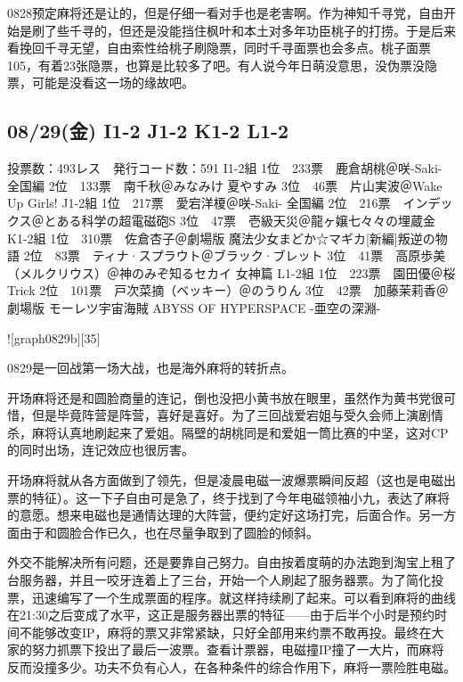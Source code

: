 0828预定麻将还是让的，但是仔细一看对手也是老害啊。作为神知千寻党，自由开始是刷了些千寻的，但还是没能挡住枫叶和本土对多年功臣桃子的打捞。于是后来看挽回千寻无望，自由索性给桃子刷隐票，同时千寻面票也会多点。桃子面票105，有着23张隐票，也算是比较多了吧。有人说今年日萌没意思，没伪票没隐票，可能是没看这一场的缘故吧。

\subsection{08/29(金) I1-2 J1-2 K1-2 L1-2}

    投票数：493レス　発行コード数：591
    I1-2組
    1位　233票　鹿倉胡桃＠咲-Saki- 全国編
    2位　133票　南千秋＠みなみけ 夏やすみ
    3位　46票　片山実波＠Wake Up Girls!
    J1-2組
    1位　217票　愛宕洋榎＠咲-Saki- 全国編
    2位　216票　インデックス＠とある科学の超電磁砲S
    3位　47票　壱級天災＠龍ヶ嬢七々々の埋蔵金
    K1-2組
    1位　310票　佐倉杏子＠劇場版 魔法少女まどか☆マギカ[新編]叛逆の物語
    2位　83票　ティナ·スプラウト＠ブラック·ブレット
    3位　41票　高原歩美（メルクリウス）＠神のみぞ知るセカイ 女神篇
    L1-2組
    1位　223票　園田優＠桜Trick
    2位　101票　戸次菜摘（ベッキー）＠のうりん
    3位　42票　加藤茉莉香＠劇場版 モーレツ宇宙海賊 ABYSS OF HYPERSPACE -亜空の深淵-

![graph0829b][35]

0829是一回战第一场大战，也是海外麻将的转折点。

开场麻将还是和圆脸商量的连记，倒也没把小黄书放在眼里，虽然作为黄书党很可惜，但是毕竟阵营是阵营，喜好是喜好。为了三回战爱宕姐与受久会师上演剧情杀，麻将认真地刷起来了爱姐。隔壁的胡桃同是和爱姐一筒比赛的中坚，这对CP的同时出场，连记效应也很厉害。

开场麻将就从各方面做到了领先，但是凌晨电磁一波爆票瞬间反超（这也是电磁出票的特征）。这一下子自由可是急了，终于找到了今年电磁领袖小九，表达了麻将的意愿。想来电磁也是通情达理的大阵营，便约定好这场打完，后面合作。另一方面由于和圆脸合作已久，也在尽量争取到了圆脸的倾斜。

外交不能解决所有问题，还是要靠自己努力。自由按着度萌的办法跑到淘宝上租了台服务器，并且一咬牙连着上了三台，开始一个人刷起了服务器票。为了简化投票，迅速编写了一个生成票面的程序。就这样持续刷了起来。可以看到麻将的曲线在21:30之后变成了水平，这正是服务器出票的特征——由于后半个小时是预约时间不能够改变IP，麻将的票又非常紧缺，只好全部用来约票不敢再投。最终在大家的努力抓票下投出了最后一波票。查看计票器，电磁撞IP撞了一大片，而麻将反而没撞多少。功夫不负有心人，在各种条件的综合作用下，麻将一票险胜电磁。

